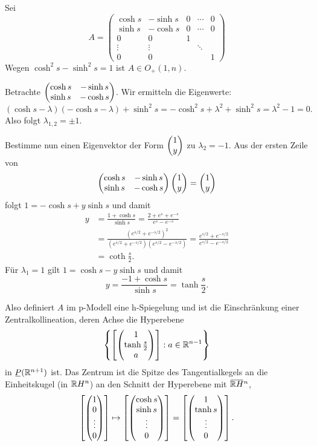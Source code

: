\begin{exmp*}
  Sei
  \[ A = \begin{pmatrix}
      \cosh s & - \sinh s & 0 & \cdots & 0 \\
      \sinh s & - \cosh s & 0 & \cdots & 0 \\
      0 & 0 & 1 \\
      \vdots & \vdots & & \ddots \\
      0 & 0 & & & 1
    \end{pmatrix}
  \]
  Wegen $\cosh^2 s - \sinh^2 s = 1$ ist $A \in O_+(1,n)$.

  Betrachte $\begin{pmatrix}\cosh s & - \sinh s \\ \sinh s & - \cosh s\end{pmatrix}$. Wir ermitteln
  die Eigenwerte:
  \[ (\cosh s - \lambda)(- \cosh s - \lambda) + \sinh^2 s =
    - \cosh^2 s + \lambda^2 + \sinh^2 s = \lambda^2 -1 = 0. \]
  Also folgt $\lambda_{1,2} = \pm 1$.

  Bestimme nun einen Eigenvektor der Form $\begin{pmatrix} 1 \\ y \end{pmatrix}$ zu $\lambda_2 = -1$.
  Aus der ersten Zeile von
  \[ \begin{pmatrix}\cosh s & - \sinh s \\ \sinh s & - \cosh s\end{pmatrix} \begin{pmatrix} 1 \\ y \end{pmatrix} = \begin{pmatrix}
      1 \\ y \end{pmatrix} \]
  folgt $1 = - \cosh s + y \sinh s$ und damit
  \begin{align*}
    y &= \frac{1 + \cosh s}{\sinh s} = \frac{2 + e^s + e^{-s}}{e^s - e^{-s}} \\
      &= \frac{(e^{s/2} + e^{-s/2})^2}{(e^{s/2}+e^{-s/2})(e^{s/2}-e^{-s/2})}
        = \frac{e^{s/2}+e^{-s/2}}{e^{s/2}-e^{-s/2}} \\
    &= \coth \frac{s}{2}.
  \end{align*}
  Für $\lambda_1 = 1$ gilt $1 = \cosh s - y \sinh s$ und damit
  \[ y = \frac{-1 + \cosh s}{\sinh s} = \tanh \frac{s}{2}. \]

Also definiert $A$ im p-Modell eine h-Spiegelung und ist die Einschränkung einer
Zentralkollineation, deren Achse die Hyperebene
\[ \left\{ \left[ \begin{pmatrix} 1 \\ \tanh \frac{s}{2} \\ a \end{pmatrix} \right] : a \in
    \mathbb{R}^{n-1} \right\} \]
in $\proj( \real^{n+1})$ ist. Das Zentrum ist die Spitze des Tangentialkegels an
die Einheitskugel (in $\mathbb{R} H^n$) an den Schnitt der Hyperebene mit
$\obar{\real H}^n$,
\[ \left[  \begin{pmatrix}1 \\ 0 \\ \vdots \\ 0\end{pmatrix} \right] \mapsto  \left[ \begin{pmatrix} \cosh s
      \\ \sinh s \\ \vdots \\ 0\end{pmatrix} \right] = \left[\begin{pmatrix} 1 \\ \tanh s \\ \vdots \\
      0\end{pmatrix}\right]. \]
\end{exmp*}

